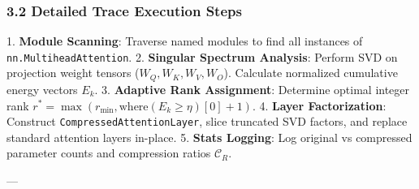 \subsubsection{3.2 Detailed Trace Execution Steps}
1. \textbf{Module Scanning}: Traverse named modules to find all instances of \texttt{nn.MultiheadAttention}.
2. \textbf{Singular Spectrum Analysis}: Perform SVD on projection weight tensors ($W_Q, W_K, W_V, W_O$). Calculate normalized cumulative energy vectors $E_k$.
3. \textbf{Adaptive Rank Assignment}: Determine optimal integer rank $r^* = \max(r_{\min}, \text{where}(E_k \ge \eta)[0] + 1)$.
4. \textbf{Layer Factorization}: Construct \texttt{CompressedAttentionLayer}, slice truncated SVD factors, and replace standard attention layers in-place.
5. \textbf{Stats Logging}: Log original vs compressed parameter counts and compression ratios $\mathcal{C}_R$.

---